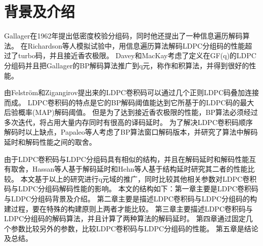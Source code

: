 \chapter{背景及介绍}
Gallager在1962年提出低密度校验分组码\cite{Gallager1963Low}，同时他还提出了一种信息遍历解码算法。
在Richardson等人模拟试验中\cite{keylist}，用信息遍历算法解码LDPC分组码的性能超过了turbo码，并且接近香农极限。
Davey和MacKay考虑了定义在GF(q)的LDPC分组码\cite{Davey1998Low}并且把Gallager的BP解码算法推广到q元，称作和积算法，并得到很好的性能。

由Felström和Zigangirov\cite{Felstrom1999Time}提出来的LDPC卷积码可以通过几个正则LDPC码叠加连接而成。
LDPC卷积码的特点是它的BP解码阈值能达到它所基于的LDPC码的最大后验概率(MAP)解码阈值\cite{Kudekar2010Threshold}。
但是为了达到接近香农极限的性能，BP算法必须经过多次迭代，将占用大量内存同时有很高的译码延时。
为了解决LDPC卷积码顺序解码时以上缺点，Papaleo等人考虑了BP算法窗口解码版本\cite{Papaleo2010Windowed}，并研究了算法中解码延时和解码性能之间的取舍。

由于LDPC卷积码与LDPC分组码具有相似的结构，并且在解码延时和解码性能互有取舍，Hassan等人基于解码延时\cite{Ul2012Comparison}和Hehn等人基于结构延时\cite{Hehn2009LDPC}研究其二者的性能比较。
本文基于以上的研究进行q元域的推广，同时比较其他相关参数对LDPC卷积码与LDPC分组码解码性能的影响。
本文的结构如下：第一章主要是LDPC卷积码与LDPC分组码背景及介绍。
第二章主要是描述LDPC卷积码与LDPC分组码的构建过程，要在特殊的构建原则上两者才能比较。
第三章主要描述LDPC卷积码与LDPC分组码的解码算法，并且计算了两种算法的解码延时。
第四章通过固定几个参数比较另外的参数，比较LDPC卷积码与LDPC分组码的性能。
第五章是结论及总结。